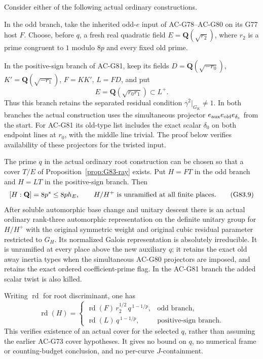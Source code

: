 \begin{theorem}
\label{thm:G83}
Consider either of the following actual ordinary constructions.

In the odd branch, take the inherited odd-\(e\) input of
AC-G78--AC-G80 on its G77 host \(F\).
Choose, before \(q\), a fresh real quadratic field
\(E=\mathbf Q(\sqrt{r_2})\), where \(r_2\) is a prime
congruent to \(1\) modulo \(8p\) and every fixed old prime.

In the positive-sign branch of AC-G81, keep its fields
\(D=\mathbf Q(\sqrt{-r_0})\), \(K'=\mathbf Q(\sqrt{-r_1})\),
\(F=KK'\), \(L=FD\), and put
\[
                         E=\mathbf Q(\sqrt{r_0r_1})
                         \subset L^+.
\]
Thus this branch retains the separated residual condition
\(\overline\gamma^2|_{G_K}\ne1\).
In both branches the actual construction uses the simultaneous
projector \(e_{\rm aux}e_{\rm old}e_{\delta_e}\) from the start.
For AC-G81 its old-type list includes the exact scalar
\(\delta_0\) on both endpoint lines at \(r_0\), with the
middle line trivial.  The proof below verifies availability
of these projectors for the twisted input.

The prime \(q\) in the actual ordinary root construction
can be chosen so that a cover \(T/E\) of
Proposition~\ref{prop:G83-ray} exists.
Put \(H=FT\) in the odd branch and \(H=LT\) in the
positive-sign branch.
Then
\[
 [H:\mathbf Q]=8p^s\le8p h_E,\qquad
 H/H^+\ \hbox{is unramified at all finite places}.   \tag{G83.9}
\]
After soluble automorphic base change and unitary descent
there is an actual ordinary rank-three automorphic
representation on the definite unitary group for \(H/H^+\)
with the original symmetric weight and original cubic
residual parameter restricted to \(G_H\).
Its normalized Galois representation is absolutely
irreducible.  It is unramified at every place above the
new auxiliary \(q\); it retains the exact old away inertia
types when the simultaneous AC-G80 projectors are imposed,
and retains the exact ordered coefficient-prime flag.
In the AC-G81 branch the added scalar twist is also killed.

Writing \(\operatorname{rd}\) for root discriminant, one has
\[
 \operatorname{rd}(H)=
 \begin{cases}
   \operatorname{rd}(F)\,r_2^{1/2}\,
           q^{\,1-1/p},&\text{odd branch},\\
   \operatorname{rd}(L)\,q^{\,1-1/p},
           &\text{positive-sign branch}.
 \end{cases}                                      \tag{G83.10}
\]
This verifies existence of an actual cover for the selected
\(q\), rather than assuming the earlier AC-G73 cover
hypotheses.  It gives no bound on \(q\), no numerical frame
or counting-budget conclusion, and no per-curve
\(J\)-containment.
\end{theorem}

